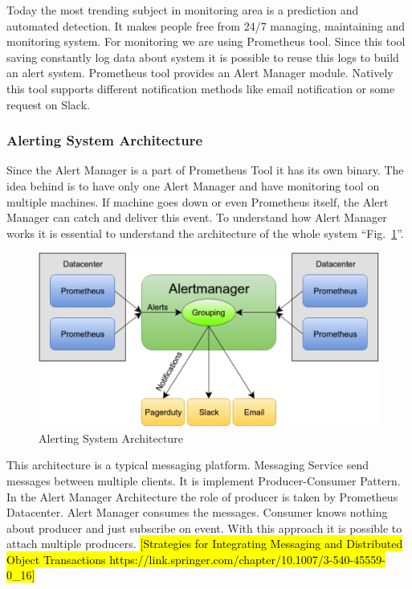 Today the most trending subject in monitoring area is a prediction and automated detection. It makes people free from 24/7 managing, maintaining and monitoring system.
For monitoring we are using Prometheus tool. Since this tool saving constantly log data about system it is possible to reuse this logs to build an alert system. 
Prometheus tool provides an Alert Manager module. Natively this tool supports different notification methods like email notification or some request on Slack. 

\subsubsection{Alerting System Architecture}\label{Alerting System Architecture}

Since the Alert Manager is a part of Prometheus Tool it has its own binary. The idea behind is to have only one Alert Manager and have monitoring tool on multiple machines. If machine goes down or even Prometheus itself, the Alert Manager can catch and deliver this event. 
To understand how Alert Manager works it is essential to understand the architecture of the whole system ``Fig.~\ref{fig:alert_arch}''.

\begin{figure}[htbp]
\begin{center}
  \includegraphics[width=\linewidth]{components/3/alert_arch.png}
  \caption{Alerting System Architecture}
  \label{fig:alert_arch}
\end{center}
\end{figure}

This architecture is a typical messaging platform. 
Messaging Service send messages between multiple clients. It is implement Producer-Consumer Pattern. In the Alert Manager Architecture the role of producer is taken by Prometheus Datacenter. Alert Manager consumes the messages. Consumer knows nothing about producer and just subscribe on event. With this approach it is possible to attach multiple producers. \hl{[Strategies for Integrating Messaging and Distributed Object Transactions https://link.springer.com/chapter/10.1007/3-540-45559-0\_16]}


